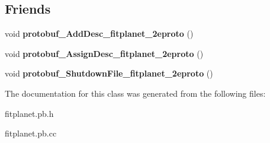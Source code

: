 \subsection*{Friends}
\begin{DoxyCompactItemize}
\item 
\hypertarget{classmachines_1_1Machine_a8630324413f042411acb26cd21efd53e}{void {\bfseries protobuf\-\_\-\-Add\-Desc\-\_\-fitplanet\-\_\-2eproto} ()}\label{classmachines_1_1Machine_a8630324413f042411acb26cd21efd53e}

\item 
\hypertarget{classmachines_1_1Machine_a005300ae4e9313c5f2d6ed15f4f18d7f}{void {\bfseries protobuf\-\_\-\-Assign\-Desc\-\_\-fitplanet\-\_\-2eproto} ()}\label{classmachines_1_1Machine_a005300ae4e9313c5f2d6ed15f4f18d7f}

\item 
\hypertarget{classmachines_1_1Machine_a3942eb78a8614c8d9d4994d09c14849d}{void {\bfseries protobuf\-\_\-\-Shutdown\-File\-\_\-fitplanet\-\_\-2eproto} ()}\label{classmachines_1_1Machine_a3942eb78a8614c8d9d4994d09c14849d}

\end{DoxyCompactItemize}


The documentation for this class was generated from the following files\-:\begin{DoxyCompactItemize}
\item 
fitplanet.\-pb.\-h\item 
fitplanet.\-pb.\-cc\end{DoxyCompactItemize}
